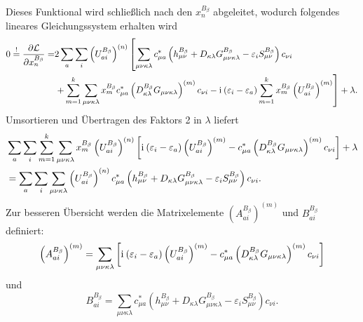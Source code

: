     Dieses Funktional wird schließlich nach den $x_n^{B_\beta}$ abgeleitet, wodurch folgendes lineares Gleichungssystem erhalten wird
    \begin{equation}
    \begin{aligned}
    0\overset{!}{=}\frac{\partial \mathcal{L}}{\partial x_n^{B_\beta}}=&2\sum_a\sum_i \left(U_{ai}^{B_\beta}\right)^{(n)}\left[\sum_{\mu\nu\kappa\lambda}c_{\mu a}^*\left(h_{\mu\nu}^{B_\beta}+D_{\kappa\lambda}G_{\mu\nu\kappa\lambda}^{B_\beta}-\varepsilon_i S_{\mu\nu}^{B_\beta}\right)c_{\nu i}\right.\\
    &\left.+\sum_{m=1}^k\sum_{\mu\nu\kappa\lambda}x_m^{B_\beta} c_{\mu a}^*\left(D_{\kappa\lambda}^{B_\beta}G_{\mu\nu\kappa\lambda}\right)^{(m)}c_{\nu i}-\mathrm{i}\mkern1mu\left(\varepsilon_i-\varepsilon_a\right)\sum_{m=1}^kx_m^{B_\beta}\left(U_{ai}^{B_\beta}\right)^{(m)}\right]+\lambda.
    \end{aligned}
    \end{equation}
    Umsortieren und Übertragen des Faktors 2 in $\lambda$ liefert
    \begin{equation}
    \begin{aligned}
    &\sum_a\sum_i\sum_{m=1}^k\sum_{\mu\nu\kappa\lambda}x_m^{B_\beta}\left(U_{ai}^{B_\beta}\right)^{(n)}\left[\mathrm{i}\mkern1mu\left(\varepsilon_i-\varepsilon_a\right)\left(U_{ai}^{B_\beta}\right)^{(m)}-c_{\mu a}^*\left(D_{\kappa\lambda}^{B_\beta}G_{\mu\nu\kappa\lambda}\right)^{(m)}c_{\nu i}\right]+\lambda\\
    &=\sum_a\sum_i\sum_{\mu\nu\kappa\lambda} \left(U_{ai}^{B_\beta}\right)^{(n)}c_{\mu a}^*\left(h_{\mu\nu}^{B_\beta}+D_{\kappa\lambda}G_{\mu\nu\kappa\lambda}^{B_\beta}-\varepsilon_i S_{\mu\nu}^{B_\beta}\right)c_{\nu i}.
    \end{aligned}
    \end{equation}
    Zur besseren Übersicht werden die Matrixelemente $\left(A_{ai}^{B_\beta}\right)^{(m)}$ und $B_{ai}^{B_\beta}$ definiert:
    \begin{equation}\label{eq:aai}
    \left(A_{ai}^{B_\beta}\right)^{(m)}=\sum_{\mu\nu\kappa\lambda}\left[\mathrm{i}\mkern1mu\left(\varepsilon_i-\varepsilon_a\right)\left(U_{ai}^{B_\beta}\right)^{(m)}-c_{\mu a}^*\left(D_{\kappa\lambda}^{B_\beta}G_{\mu\nu\kappa\lambda}\right)^{(m)}c_{\nu i}\right]
    \end{equation}
    und 
    \begin{equation}\label{eq:bai}
    B_{ai}^{B_\beta}=\sum_{\mu\nu\kappa\lambda} c_{\mu a}^*\left(h_{\mu\nu}^{B_\beta}+D_{\kappa\lambda}G_{\mu\nu\kappa\lambda}^{B_\beta}-\varepsilon_i S_{\mu\nu}^{B_\beta}\right)c_{\nu i}.
    \end{equation}

